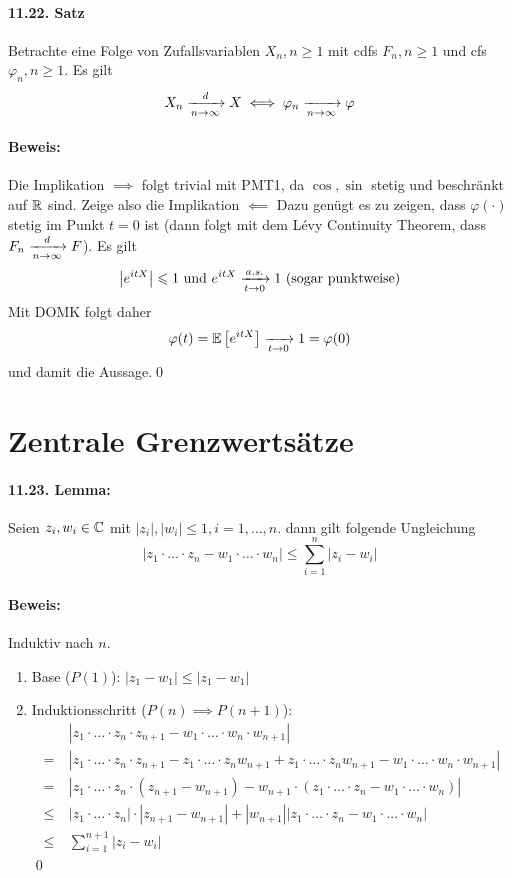 \paragraph{11.22. Satz}Betrachte eine Folge von Zufallsvariablen $X_n,n\geq1$ mit cdfs $F_n,n\geq1$ und cfs $\varphi_n,n\geq1$. Es gilt
$$X_n\nto{d}{n\to\infty}X\iff\varphi_n\nto{}{n\to\infty}\varphi$$

\paragraph{Beweis:}Die Implikation $\implies$ folgt trivial mit PMT1, da $\cos,\sin$ stetig und beschr\"ankt auf $\mathbb{R}$ sind.
Zeige also die Implikation $\impliedby$\newline
 Dazu gen\"ugt es zu zeigen, dass $\varphi(\cdot)$ stetig im Punkt $t=0$ ist (dann folgt mit dem L\'evy Continuity Theorem, dass $F_n\nto{d}{n\to\infty}F$). Es gilt
 $$\left|e^{itX}\right|\leq1 \text{ und }e^{itX}\nto{a.s.}{t\to0}1\text{ (sogar punktweise)}$$
 Mit DOMK folgt daher
 $$\varphi(t)=\E \left[e^{itX}\right]\nto{}{t\to0}1=\varphi(0)$$
 und damit die Aussage.\qed
 
 \section*{Zentrale Grenzwerts\"atze}
 \paragraph{11.23. Lemma:}Seien $z_i,w_i\in\mathbb{C}$ mit $|z_i|,|w_i|\leq1,i=1,\hdots,n$. dann gilt folgende Ungleichung
 $$|z_1\cdot\hdots\cdot z_n-w_1\cdot\hdots\cdot w_n|\leq\sum_{i=1}^n|z_i-w_i|$$
 
 \paragraph{Beweis:}Induktiv nach $n$.
 \begin{enumerate}
     \item Base ($P(1)$): $|z_1-w_1|\leq|z_1-w_1|$
     \item Induktionsschritt ($P(n)\implies P(n+1)$): 
     \begin{align*}
         &|z_1\cdot\hdots\cdot z_n\cdot z_{n+1}-w_1\cdot\hdots\cdot w_n\cdot w_{n+1}|\\
         =\ &|z_1\cdot\hdots\cdot z_n\cdot z_{n+1}-z_1\cdot\hdots\cdot z_nw_{n+1}+z_1\cdot\hdots\cdot z_nw_{n+1}-w_1\cdot\hdots\cdot w_n\cdot w_{n+1}|\\
         =\ &|z_1\cdot\hdots\cdot z_n\cdot(z_{n+1}-w_{n+1})-w_{n+1}\cdot(z_1\cdot\hdots\cdot z_n-w_1\cdot\hdots\cdot w_n)| \\
         \leq\ &|z_1\cdot\hdots\cdot z_n|\cdot|z_{n+1}-w_{n+1}|+|w_{n+1}||z_1\cdot\hdots\cdot z_n-w_1\cdot\hdots\cdot w_n| \\
         \leq\ &\sum_{i=1}^{n+1}|z_i-w_i|  
     \end{align*}
     \qed
 \end{enumerate}
 
